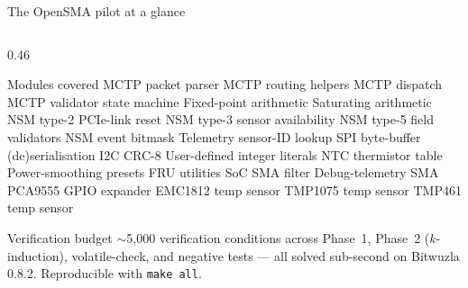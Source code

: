 \documentclass[aspectratio=169,11pt]{beamer}
\begin{document}
\begin{frame}{The OpenSMA pilot at a glance}
\begin{columns}[T,onlytextwidth]
    \hfill
    \begin{column}{0.46\textwidth}
      \begin{block}{Modules covered}
        \tiny
        MCTP packet parser \textbar{} MCTP routing helpers \textbar{}
        MCTP dispatch \textbar{} MCTP validator state machine \textbar{}
        Fixed-point arithmetic \textbar{} Saturating arithmetic \textbar{}
        NSM type-2 PCIe-link reset \textbar{} NSM type-3 sensor availability
        \textbar{} NSM type-5 field validators \textbar{} NSM event bitmask
        \textbar{} Telemetry sensor-ID lookup \textbar{} SPI byte-buffer
        (de)serialisation \textbar{} I2C CRC-8 \textbar{} User-defined
        integer literals \textbar{} NTC thermistor table \textbar{}
        Power-smoothing presets \textbar{} FRU utilities \textbar{}
        SoC SMA filter \textbar{} Debug-telemetry SMA \textbar{}
        PCA9555 GPIO expander \textbar{} EMC1812 temp sensor \textbar{}
        TMP1075 temp sensor \textbar{} TMP461 temp sensor
      \end{block}

      \begin{block}{Verification budget}
        \scriptsize
        $\sim$5{,}000 verification conditions across Phase~1, Phase~2
        ($k$-induction), volatile-check, and negative tests --- all solved
        sub-second on Bitwuzla 0.8.2. Reproducible with \texttt{make all}.
      \end{block}
    \end{column}
  \end{columns}
\end{frame}
\end{document}
